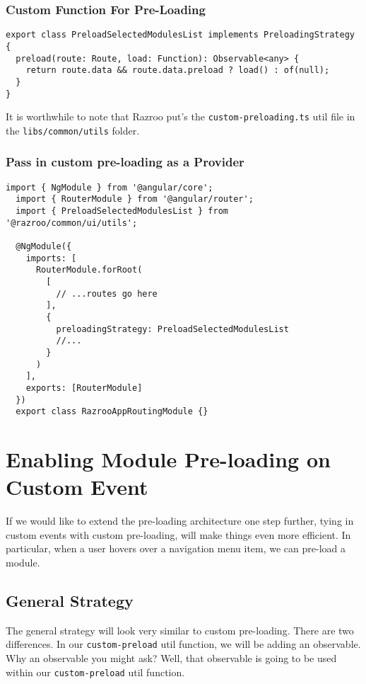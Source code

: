 \subsubsection{Custom Function For Pre-Loading}
\begin{lstlisting}[caption=custom-preloading.ts]
export class PreloadSelectedModulesList implements PreloadingStrategy {
  preload(route: Route, load: Function): Observable<any> {
    return route.data && route.data.preload ? load() : of(null);
  }
}
\end{lstlisting}

It is worthwhile to note that Razroo put's the \lstinline{custom-preloading.ts} 
util file in the \lstinline{libs/common/utils} folder.

\subsubsection{Pass in custom pre-loading as a Provider}
\begin{lstlisting}[caption=app.routing.module.ts]
  import { NgModule } from '@angular/core';
  import { RouterModule } from '@angular/router';
  import { PreloadSelectedModulesList } from '@razroo/common/ui/utils';
  
  @NgModule({
    imports: [
      RouterModule.forRoot(
        [
          // ...routes go here
        ],
        {
          preloadingStrategy: PreloadSelectedModulesList
          //...
        }
      )
    ],
    exports: [RouterModule]
  })
  export class RazrooAppRoutingModule {}
  \end{lstlisting}

\section{Enabling Module Pre-loading on Custom Event}
If we would like to extend the pre-loading architecture one step further, 
tying in custom events with custom pre-loading, will make things even 
more efficient. In particular, when a user hovers over a navigation menu item, 
we can pre-load a module. 

\subsection{General Strategy}
The general strategy will look very similar to custom pre-loading. 
There are two differences. In our \lstinline{custom-preload} util function,
we will be adding an observable. Why an observable you might ask? Well, 
that observable is going to be used within our \lstinline{custom-preload} util 
function. 




